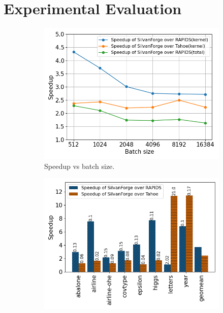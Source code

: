 \section{Experimental Evaluation}
\label{sec:results}

\begin{figure}[htb]
  \begin{subfigure}[t]{.32\linewidth}
    \includegraphics[width=\textwidth]{figures/geomean_speedup_4060_kernel_time_total_time.png}
    \caption{\label{Fig:TBvsRAPIDSTahoe_4060_Speedup}Speedup vs batch size.}      
  \end{subfigure}
  \begin{subfigure}[t]{.32\linewidth}
    \includegraphics[width=\textwidth]{figures/speedup_bar_graph_1024.png}

\end{subfigure}
\end{figure}
